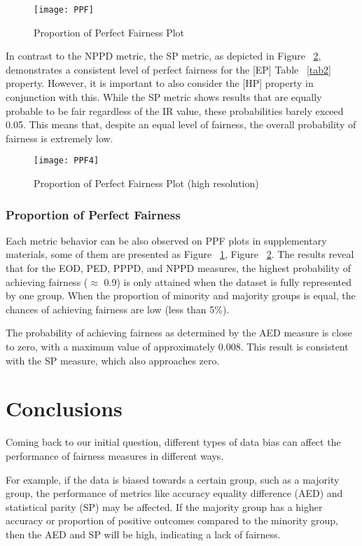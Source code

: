 \documentclass[sn-vancouver]{sn-jnl}%
\theoremstyle{thmstyleone}%
\theoremstyle{thmstyletwo}%
\theoremstyle{thmstylethree}%
\begin{document}
\begin{figure}[h]%
\centering
\texttt{[image: PPF]}
\caption{Proportion of Perfect Fairness Plot}\label{fig2}
\end{figure}

In contrast to the NPPD metric, the SP metric, as depicted in Figure ~\ref{fig3}, demonstrates a consistent level of perfect fairness for the [EP] Table ~\ref{tab2} property. However, it is important to also consider the [HP] property in conjunction with this. While the SP metric shows results that are equally probable to be fair regardless of the IR value, these probabilities barely exceed 0.05. This means that, despite an equal level of fairness, the overall probability of fairness is extremely low.

\begin{figure}[h]%
\centering
\texttt{[image: PPF4]}
\caption{Proportion of Perfect Fairness Plot (high resolution)}\label{fig3}
\end{figure}

\subsubsection{Proportion of Perfect Fairness}\label{subsubsec2}

Each metric behavior can be also observed on PPF plots in supplementary materials, some of them are presented as Figure ~\ref{fig2}, Figure ~\ref{fig3}. The results reveal that for the EOD, PED, PPPD, and NPPD measures, the highest probability of achieving fairness ($\approx$ 0.9) is only attained when the dataset is fully represented by one group. When the proportion of minority and majority groups is equal, the chances of achieving fairness are low (less than 5\%).

The probability of achieving fairness as determined by the AED measure is close to zero, with a maximum value of approximately 0.008. This result is consistent with the SP measure, which also approaches zero.

\section{Conclusions}\label{sec5}

Coming back to our initial question, different types of data bias can affect the performance of fairness measures in different ways.

For example, if the data is biased towards a certain group, such as a majority group, the performance of metrics like accuracy equality difference (AED) and statistical parity (SP) may be affected. If the majority group has a higher accuracy or proportion of positive outcomes compared to the minority group, then the AED and SP will be high, indicating a lack of fairness.
\end{document}

